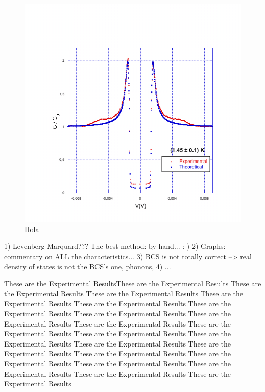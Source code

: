 \begin{figure}[h!]
\centering
\includegraphics[scale=0.4]{graph5}
\caption{Hola\label{graph5}}
\end{figure}



1) Levenberg-Marquard??? The best method: by hand... :-)
2) Graphs: commentary on ALL the characteristics...
3) BCS is not totally correct --> real density of states is not the BCS's one, phonons,
4) ...


These are the Experimental ResultsThese are the Experimental Results These are the Experimental Results These are the Experimental Results These are the Experimental Results These are the Experimental Results These are the Experimental Results These are the Experimental Results These are the Experimental Results These are the Experimental Results These are the Experimental Results These are the Experimental Results These are the Experimental Results These are the Experimental Results These are the Experimental Results These are the Experimental Results These are the Experimental Results These are the Experimental Results These are the Experimental Results These are the Experimental Results These are the Experimental Results 